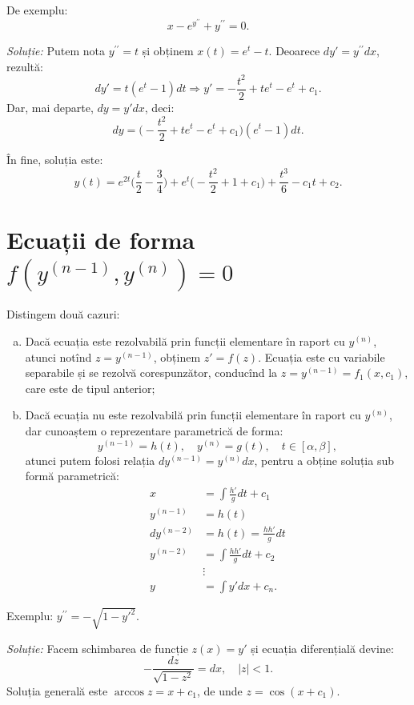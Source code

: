 \documentclass[11pt,a4paper]{article}
\theoremstyle{dotless}
\theoremstyle{dotlessdr}
\begin{document}
De exemplu:
\[
  x - e^{y^{\prime \prime}} + y^{\prime \prime} = 0.
\]

\emph{Soluție:} Putem nota $y^{\prime \prime} = t$ și obținem $x(t) = e^t - t$.
Deoarece $dy' = y^{\prime\prime} dx$, rezultă:
\[
  dy' = t(e^t - 1) dt \Rightarrow y' = -\frac{t^2}{2} + te^t - e^t + c_1.
\]
Dar, mai departe, $dy = y' dx$, deci:
\[
  dy = \big( - \frac{t^2}{2} + te^t - e^t + c_1)(e^t - 1) dt.
\]

În fine, soluția este:
\[
  y(t) = e^{2t}\big( \frac{t}{2} - \frac{3}{4} \big) + %
  e^t \big( -\frac{t^2}{2} + 1 + c_1 \big) + \frac{t^3}{6} - c_1 t + c_2.
\]


\section{Ecuații de forma $f(y^{(n-1)}, y^{(n)}) = 0$}

Distingem două cazuri:

\begin{enumerate}[(a)]
\item Dacă ecuația este rezolvabilă prin funcții elementare în raport cu $y^{(n)}$,
  atunci notînd $z = y^{(n-1)}$, obținem $z' = f(z)$. Ecuația este cu variabile separabile
  și se rezolvă corespunzător, conducînd la $z = y^{(n-1)} = f_1(x, c_1)$, care este
  de tipul anterior;
\item Dacă ecuația nu este rezolvabilă prin funcții elementare în raport cu $y^{(n)}$,
  dar cunoaștem o reprezentare parametrică de forma:
  \[
    y^{(n-1)} = h(t), \quad y^{(n)} = g(t), \quad t \in [\alpha, \beta],
  \]
  atunci putem folosi relația $dy^{(n-1)} = y^{(n)}dx$, pentru a obține
  soluția sub formă parametrică:
  \begin{align*}
    x &= \int \frac{h'}{g} dt + c_1 \\
    y^{(n-1)} &= h(t) \\
    dy^{(n-2)} &= h(t) = \frac{hh'}{g} dt \\
    y^{(n-2)} &= \int \frac{hh'}{g} dt + c_2 \\
    &\vdots \\
    y &= \int y' dx + c_n.
  \end{align*}
\end{enumerate}

Exemplu: $y^{\prime \prime} = -\sqrt{1 - {y'}^2}$.

\emph{Soluție:} Facem schimbarea de funcție $z(x) = y'$ și ecuația diferențială
devine:
\[
  - \frac{dz}{\sqrt{1 - z^2}} = dx, \quad |z| < 1.
\]
Soluția generală este $\arccos z = x + c_1$, de unde $z = \cos(x + c_1)$.
\end{document}
